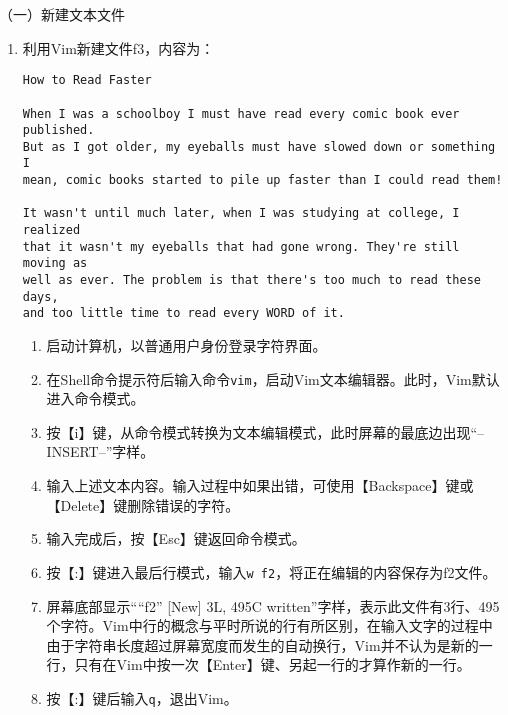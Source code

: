 \vspace{0.1in}
（一）新建文本文件
\begin{enumerate}
  \item 利用Vim新建文件f3，内容为：
\begin{verbatim}
How to Read Faster

When I was a schoolboy I must have read every comic book ever published.
But as I got older, my eyeballs must have slowed down or something I
mean, comic books started to pile up faster than I could read them!

It wasn't until much later, when I was studying at college, I realized
that it wasn't my eyeballs that had gone wrong. They're still moving as
well as ever. The problem is that there's too much to read these days,
and too little time to read every WORD of it.
\end{verbatim}
    \begin{enumerate}
      \item 启动计算机，以普通用户身份登录字符界面。
      \item 在Shell命令提示符后输入命令\verb|vim|，启动Vim文本编辑器。此时，Vim默认进入命令模式。
      \item 按【i】键，从命令模式转换为文本编辑模式，此时屏幕的最底边出现“--INSERT--”字样。
      \item 输入上述文本内容。输入过程中如果出错，可使用【Backspace】键或【Delete】键删除错误的字符。
      \item 输入完成后，按【Esc】键返回命令模式。
      \item 按【:】键进入最后行模式，输入\verb|w f2|，将正在编辑的内容保存为f2文件。
      \item 屏幕底部显示“``f2'' [New] 3L, 495C written”字样，表示此文件有3行、495个字符。Vim中行的概念与平时所说的行有所区别，在输入文字的过程中由于字符串长度超过屏幕宽度而发生的自动换行，Vim并不认为是新的一行，只有在Vim中按一次【Enter】键、另起一行的才算作新的一行。
      \item 按【:】键后输入\verb|q|，退出Vim。
    \end{enumerate}
\end{enumerate}

